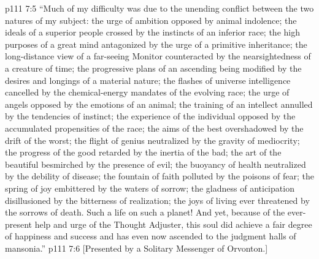 \vs p111 7:5 \pc “Much of my difficulty was due to the unending conflict between the two natures of my subject: the urge of ambition opposed by animal indolence; the ideals of a superior people crossed by the instincts of an inferior race; the high purposes of a great mind antagonized by the urge of a primitive inheritance; the long\hyp{}distance view of a far\hyp{}seeing Monitor counteracted by the nearsightedness of a creature of time; the progressive plans of an ascending being modified by the desires and longings of a material nature; the flashes of universe intelligence cancelled by the chemical\hyp{}energy mandates of the evolving race; the urge of angels opposed by the emotions of an animal; the training of an intellect annulled by the tendencies of instinct; the experience of the individual opposed by the accumulated propensities of the race; the aims of the best overshadowed by the drift of the worst; the flight of genius neutralized by the gravity of mediocrity; the progress of the good retarded by the inertia of the bad; the art of the beautiful besmirched by the presence of evil; the buoyancy of health neutralized by the debility of disease; the fountain of faith polluted by the poisons of fear; the spring of joy embittered by the waters of sorrow; the gladness of anticipation disillusioned by the bitterness of realization; the joys of living ever threatened by the sorrows of death. Such a life on such a planet! And yet, because of the ever\hyp{}present help and urge of the Thought Adjuster, this soul did achieve a fair degree of happiness and success and has even now ascended to the judgment halls of mansonia.”
\vsetoff
\vs p111 7:6 [Presented by a Solitary Messenger of Orvonton.]
